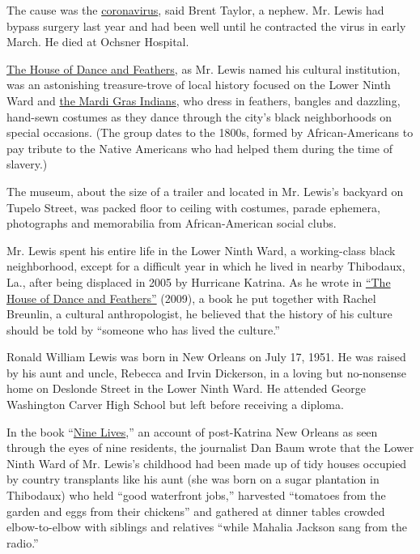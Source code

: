 The cause was the
\href{https://www.nytimes3xbfgragh.onion/2020/04/13/us/coronavirus-new-orleans-mardi-gras.html}{coronavirus},
said Brent Taylor, a nephew. Mr. Lewis had bypass surgery last year and
had been well until he contracted the virus in early March. He died at
Ochsner Hospital.

\href{houseofdanceandfeathers.org/}{The House of Dance and Feathers}, as
Mr. Lewis named his cultural institution, was an astonishing
treasure-trove of local history focused on the Lower Ninth Ward and
\href{https://www.neworleans.com/things-to-do/music/history-and-traditions/mardi-gras-indians/}{the
Mardi Gras Indians}, who dress in feathers, bangles and dazzling,
hand-sewn costumes as they dance through the city's black neighborhoods
on special occasions. (The group dates to the 1800s, formed by
African-Americans to pay tribute to the Native Americans who had helped
them during the time of slavery.)

The museum, about the size of a trailer and located in Mr. Lewis's
backyard on Tupelo Street, was packed floor to ceiling with costumes,
parade ephemera, photographs and memorabilia from African-American
social clubs.

Mr. Lewis spent his entire life in the Lower Ninth Ward, a working-class
black neighborhood, except for a difficult year in which he lived in
nearby Thibodaux, La., after being displaced in 2005 by Hurricane
Katrina. As he wrote in
\href{https://www.neighborhoodstoryproject.org/product-page/the-house-of-dance-feathers}{``The
House of Dance and Feathers''} (2009), a book he put together with
Rachel Breunlin, a cultural anthropologist, he believed that the history
of his culture should be told by ``someone who has lived the culture.''

Ronald William Lewis was born in New Orleans on July 17, 1951. He was
raised by his aunt and uncle, Rebecca and Irvin Dickerson, in a loving
but no-nonsense home on Deslonde Street in the Lower Ninth Ward. He
attended George Washington Carver High School but left before receiving
a diploma.

In the book
``\href{https://www.nytimes3xbfgragh.onion/2009/02/18/books/chapters/excerpt-the-nine.html?action=click\&module=RelatedCoverage\&pgtype=Article\&region=Footer}{Nine
Lives},'' an account of post-Katrina New Orleans as seen through the
eyes of nine residents, the journalist Dan Baum wrote that the Lower
Ninth Ward of Mr. Lewis's childhood had been made up of tidy houses
occupied by country transplants like his aunt (she was born on a sugar
plantation in Thibodaux) who held ``good waterfront jobs,'' harvested
``tomatoes from the garden and eggs from their chickens'' and gathered
at dinner tables crowded elbow-to-elbow with siblings and relatives
``while Mahalia Jackson sang from the radio.''

